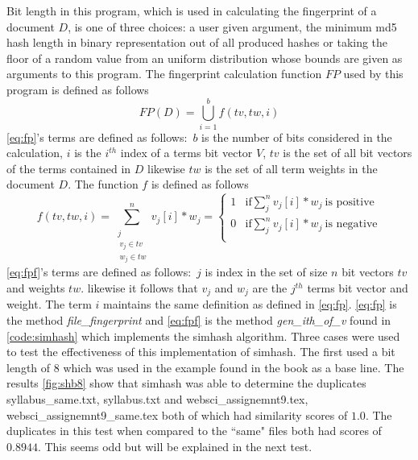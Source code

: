 \documentclass[11pt]{article}
\begin{document}
\noindent 
Bit length in this program, which is used in calculating the fingerprint of a document $D$, is one of three choices: a user given argument, the minimum md5 hash length in binary representation out of all produced hashes or taking the floor of a random value from an uniform distribution whose bounds are given as arguments to this program. The fingerprint calculation function $FP$ used by this program is defined as follows \newline
\begin{equation}
\label{eq:fp}
 \displaystyle FP(D) = \bigcup_{i=1}^{b} f(tv,tw,i)
\end{equation}
\autoref{eq:fp}'s terms are defined as follows$:$  $b$ is the number of bits considered in the calculation, $i$ is the  $i^{th}$ index of a terms bit vector $V$,  $tv$ is the set of all bit vectors of the terms contained in $D$ likewise $tw$ is the set of all term weights in the document $D$. The function $f$ is defined as follows  \newline
\begin{equation} 
\label{eq:fpf}
\displaystyle f(tv,tw,i) =\sum_{\substack{
	j \\
 \ v_j \in tv \\ \ w_j \in tw
}}^{n} v_j[i] * w_j  = 
\begin{cases}
 1 & \text{if} \sum_{j}^{n} v_j[i] * w_j \ \text{is positive} \\
 0 & \text{if} \sum_{j}^{n} v_j[i] * w_j \ \text{is negative} \\
\end{cases}
\end{equation}
\autoref{eq:fpf}'s terms are defined as follows$:$ $j$ is index in the set of size $n$ bit vectors $tv$ and weights $tw$. likewise it follows that $v_j$ and $w_j$ are the $j^{th}$ terms bit vector and weight. The term $i$ maintains the same definition as defined in \autoref{eq:fp}. \autoref{eq:fp} is the method \emph{file\_fingerprint} and \autoref{eq:fpf} is the method \emph{gen\_ith\_of\_v} found in \autoref{code:simhash} which implements the simhash algorithm. 
\newpage
\clearpage
Three cases were used to test the effectiveness of this implementation of simhash. The first used a bit length of 8  which was used in the example found in the book \citep[pp. 64]{CroftMetzlerStrohman200902} as a base line. The results \autoref{fig:shb8} show that simhash was able to determine the duplicates syllabus\_same.txt, syllabus.txt and websci\_assignemnt9.tex, websci\_assignemnt9\_same.tex  both of which had similarity scores of $1.0$. The duplicates in this test when compared to the ``same" files both had scores of  $0.8944$. This seems odd but will be explained in the next test.
\end{document}

